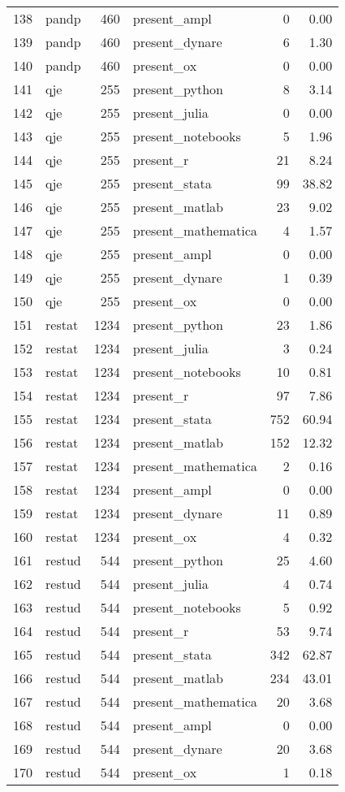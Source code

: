 \begin{table}[ht]
\begin{tabular}{rlrlrr}
  138 & pandp & 460 & present\_ampl &   0 & 0.00 \\ 
  139 & pandp & 460 & present\_dynare &   6 & 1.30 \\ 
  140 & pandp & 460 & present\_ox &   0 & 0.00 \\ 
  141 & qje & 255 & present\_python &   8 & 3.14 \\ 
  142 & qje & 255 & present\_julia &   0 & 0.00 \\ 
  143 & qje & 255 & present\_notebooks &   5 & 1.96 \\ 
  144 & qje & 255 & present\_r &  21 & 8.24 \\ 
  145 & qje & 255 & present\_stata &  99 & 38.82 \\ 
  146 & qje & 255 & present\_matlab &  23 & 9.02 \\ 
  147 & qje & 255 & present\_mathematica &   4 & 1.57 \\ 
  148 & qje & 255 & present\_ampl &   0 & 0.00 \\ 
  149 & qje & 255 & present\_dynare &   1 & 0.39 \\ 
  150 & qje & 255 & present\_ox &   0 & 0.00 \\ 
  151 & restat & 1234 & present\_python &  23 & 1.86 \\ 
  152 & restat & 1234 & present\_julia &   3 & 0.24 \\ 
  153 & restat & 1234 & present\_notebooks &  10 & 0.81 \\ 
  154 & restat & 1234 & present\_r &  97 & 7.86 \\ 
  155 & restat & 1234 & present\_stata & 752 & 60.94 \\ 
  156 & restat & 1234 & present\_matlab & 152 & 12.32 \\ 
  157 & restat & 1234 & present\_mathematica &   2 & 0.16 \\ 
  158 & restat & 1234 & present\_ampl &   0 & 0.00 \\ 
  159 & restat & 1234 & present\_dynare &  11 & 0.89 \\ 
  160 & restat & 1234 & present\_ox &   4 & 0.32 \\ 
  161 & restud & 544 & present\_python &  25 & 4.60 \\ 
  162 & restud & 544 & present\_julia &   4 & 0.74 \\ 
  163 & restud & 544 & present\_notebooks &   5 & 0.92 \\ 
  164 & restud & 544 & present\_r &  53 & 9.74 \\ 
  165 & restud & 544 & present\_stata & 342 & 62.87 \\ 
  166 & restud & 544 & present\_matlab & 234 & 43.01 \\ 
  167 & restud & 544 & present\_mathematica &  20 & 3.68 \\ 
  168 & restud & 544 & present\_ampl &   0 & 0.00 \\ 
  169 & restud & 544 & present\_dynare &  20 & 3.68 \\ 
  170 & restud & 544 & present\_ox &   1 & 0.18 \\ 
   \hline
\end{tabular}
\end{table}
